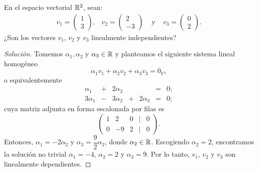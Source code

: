 \documentclass[a4,11pt]{aleph-notas}
\begin{document}
\encabezado

\begin{ejer}
    En el espacio vectorial $\mathbb{R}^{2}$, sean:
    \[
        \begin{array}{cccc}
            v_1 = \begin{pmatrix} 1\\ 3 \end{pmatrix}, &
            v_2 = \begin{pmatrix} 2\\ -3 \end{pmatrix} &
            \text{ y } &
            v_3 = \begin{pmatrix} 0\\ 2 \end{pmatrix}.
        \end{array}
    \]
    ¿Son los vectores $v_1$, $v_2$ y $v_3$ linealmente independientes?
\end{ejer}

\begin{proof}[Solución]\hspace{0pt}
    Tomemos $\alpha_1, \alpha_2$ y $\alpha_3\in\mathbb{R}$ y planteamos el siguiente sistema lineal homogéneo
    \[
        \alpha_1 v_1 + \alpha_2 v_2 + \alpha_3 v_3 = 0_V,
    \]
    o equivalentemente
    \[
        \begin{array}{ccccccc}
            \alpha_1 & + & 2\alpha_2 & & & = & 0;\\
            3\alpha_1 & - & 3\alpha_2 & + & 2\alpha_3& = & 0;
        \end{array}
    \]
    cuya matriz adjunta en forma escalonada por filas es
    \[
        \begin{pmatrix}
            1 & 2 & 0 & | & 0\\
            0 & -9 & 2 & | & 0
        \end{pmatrix}.
    \]
    Entonces, $\alpha_1 = -2\alpha_2$ y $\alpha_3 = \dfrac{9}{2}\alpha_2$, donde $\alpha_2\in\mathbb{R}$. Escogiendo $\alpha_{2} = 2$, encontramos la solución no trivial $\alpha_{1}=-4$, $\alpha_2=2$ y $\alpha_3 = 9$. Por lo tanto, $v_1$, $v_2$ y $v_3$ son linealmente dependientes.
\end{proof}
\end{document}
